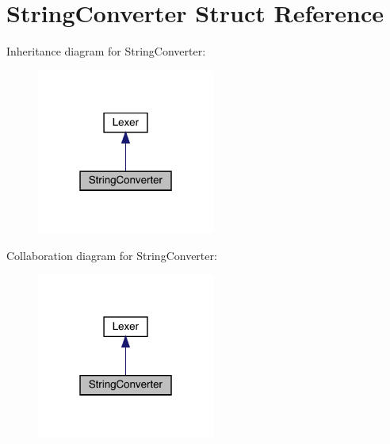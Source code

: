 \hypertarget{struct_string_converter}{}\section{String\+Converter Struct Reference}
\label{struct_string_converter}


Inheritance diagram for String\+Converter\+:\nopagebreak
\begin{figure}[H]
\begin{center}
\leavevmode
\includegraphics[width=166pt]{struct_string_converter__inherit__graph}
\end{center}
\end{figure}


Collaboration diagram for String\+Converter\+:\nopagebreak
\begin{figure}[H]
\begin{center}
\leavevmode
\includegraphics[width=166pt]{struct_string_converter__coll__graph}
\end{center}
\end{figure}
